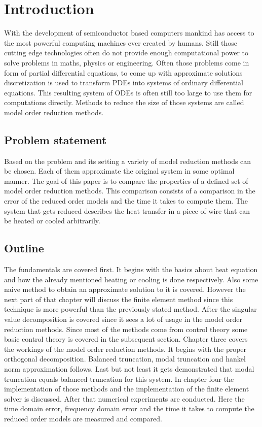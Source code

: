 \chapter{Introduction}
With the development of semiconductor based computers mankind has access to the most powerful computing machines ever created by humans.
Still those cutting edge technologies often do not provide enough computational power to solve problems in maths, physics or engineering.
Often those problems come in form of partial differential equations, to come up with approximate solutions discretization is used to transform PDEs into systems of ordinary differential equations.
This resulting system of ODEs is often still too large to use them for computations directly.
Methods to reduce the size of those systems are called model order reduction methods.

\section{Problem statement}
Based on the problem and its setting a variety of model reduction methods can be chosen.
Each of them approximate the original system in some optimal manner.
The goal of this paper is to compare the properties of a defined set of model order reduction methods.
This comparison consists of a comparison in the error of the reduced order models and the time it takes to compute them.
The system that gets reduced describes the heat transfer in a piece of wire that can be heated or cooled arbitrarily.

\section{Outline}
The fundamentals are covered first.
It begins with the basics about heat equation and how the already mentioned heating or cooling is done respectively.
Also some naive method to obtain an approximate solution to it is covered.
However the next part of that chapter will discuss the finite element method since this technique is more powerful than the previously stated method.
After the singular value decomposition is covered since it sees a lot of usage in the model order reduction methods.
Since most of the methods come from control theory some basic control theory is covered in the subsequent section.
Chapter three covers the workings of the model order reduction methods.
It begins with the proper orthogonal decomposition.
Balanced truncation, modal truncation and hankel norm approximation follows.
Last but not least it gets demonstrated that modal truncation equals balanced truncation for this system.
In chapter four the implementation of those methods and the implementation of the finite element solver is discussed.
After that numerical experiments are conducted.
Here the time domain error, frequency domain error and the time it takes to compute the reduced order models are measured and compared.




